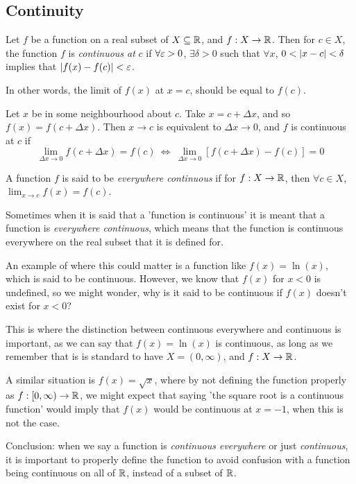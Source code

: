 \documentclass[12pt]{article}
\theoremstyle{definition}
\newcommand{\xlim}{\lim_{x \rightarrow c}}
\begin{document}
        \subsection{Continuity}
        \begin{definition}[Continuity]
            Let $f$ be a function on a real subset of $X \subseteq \R$, and $f: X \rightarrow \R$. Then for $c \in X$, the function $f$ is \emph{continuous at} $c$ if $\forall \varepsilon > 0$, $\exists \delta > 0$ such that $\forall x$, $0 < \left|x - c\right| < \delta$ implies that $\left|f(x) - f(c)\right| < \varepsilon$.

            In other words, the limit of $f(x)$ at $x = c$, should be equal to $f(c)$.
        \end{definition}
        \begin{definition}
            Let $x$ be in some neighbourhood about $c$. Take $x = c + \Delta x$, and so $f(x) = f(c + \Delta x)$. Then $x \rightarrow c$ is equivalent to $\Delta x \rightarrow 0$, and $f$ is continuous at $c$ if 
            \begin{equation*}
                \lim_{\Delta x \rightarrow 0}f(c + \Delta x) = f(c) ~ \Longleftrightarrow ~ \lim_{\Delta x \rightarrow 0}\left[f(c + \Delta x) - f(c)\right] = 0
            \end{equation*}
        \end{definition}
        \begin{definition}
            A function $f$ is said to be \emph{everywhere continuous} if for $f: X \rightarrow \R$, then $\forall c \in X$, $\xlim f(x) = f(c)$.
        \end{definition}
        \begin{remark}
            Sometimes when it is said that a 'function is continuous' it is meant that a function is \emph{everywhere continuous}, which means that the function is continuous everywhere on the real subset that it is defined for. 

            An example of where this could matter is a function like $f(x) = \ln(x)$, which is said to be continuous. However, we know that $f(x)$ for $x < 0$ is undefined, so we might wonder, why is it said to be continuous if $f(x)$ doesn't exist for $x < 0$? 

            This is where the distinction between continuous everywhere and continuous is important, as we can say that $f(x) = \ln(x)$ is continuous, as long as we remember that is is standard to have $X = (0, \infty)$, and $f: X \rightarrow \R$.

            A similar situation is $f(x) = \sqrt{x}$, where by not defining the function properly as $f: [0, \infty) \rightarrow \R$, we might expect that saying 'the square root is a continuous function' would imply that $f(x)$ would be continuous at $x = -1$, when this is not the case. 

            Conclusion: when we say a function is \emph{continuous everywhere} or just \emph{continuous}, it is important to properly define the function to avoid confusion with a function being continuous on all of $\R$, instead of a subset of $\R$.
        \end{remark}
\end{document}
